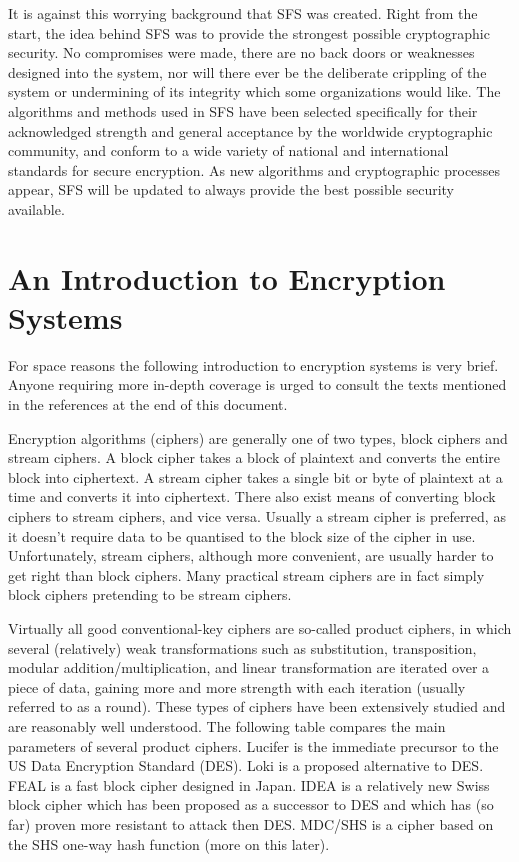 It is against this worrying background that SFS was created.  Right from the
start, the idea behind SFS was to provide the strongest possible cryptographic
security.  No compromises were made, there are no back doors or weaknesses
designed into the system, nor will there ever be the deliberate crippling of
the system or undermining of its integrity which some organizations would like.
The algorithms and methods used in SFS have been selected specifically for
their acknowledged strength and general acceptance by the worldwide
cryptographic community, and conform to a wide variety of national and
international standards for secure encryption.  As new algorithms and
cryptographic processes appear, SFS will be updated to always provide the best
possible security available.


\section{An Introduction to Encryption Systems}

For space reasons the following introduction to encryption systems is very
brief.  Anyone requiring more in-depth coverage is urged to consult the texts
mentioned in the references at the end of this document.

Encryption algorithms (ciphers) are generally one of two types, block ciphers
and stream ciphers.  A block cipher takes a block of plaintext and converts the
entire block into ciphertext.  A stream cipher takes a single bit or byte of
plaintext at a time and converts it into ciphertext.  There also exist means of
converting block ciphers to stream ciphers, and vice versa.  Usually a stream
cipher is preferred, as it doesn't require data to be quantised to the block
size of the cipher in use.  Unfortunately, stream ciphers, although more
convenient, are usually harder to get right than block ciphers.  Many practical
stream ciphers are in fact simply block ciphers pretending to be stream
ciphers.

Virtually all good conventional-key ciphers are so-called product ciphers, in
which several (relatively) weak transformations such as substitution,
transposition, modular addition/multiplication, and linear transformation are
iterated over a piece of data, gaining more and more strength with each
iteration (usually referred to as a round).  These types of ciphers have been
extensively studied and are reasonably well understood.  The following table
compares the main parameters of several product ciphers.  Lucifer is the
immediate precursor to the US Data Encryption Standard (DES).  Loki is a
proposed alternative to DES.  FEAL is a fast block cipher designed in Japan.
IDEA is a relatively new Swiss block cipher which has been proposed as a
successor to DES and which has (so far) proven more resistant to attack then
DES.  MDC/SHS is a cipher based on the SHS one-way hash function (more on this
later).


